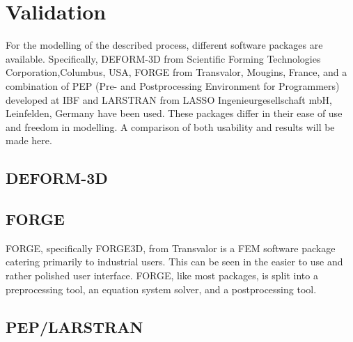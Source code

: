 \section{Validation}

For the modelling of the described process, different software packages are available. Specifically, DEFORM-3D from Scientific Forming Technologies Corporation,Columbus, USA, FORGE from Transvalor, Mougins, France, and a combination of PEP (Pre- and Postprocessing Environment for Programmers) developed at IBF and LARSTRAN from LASSO Ingenieurgesellschaft mbH, Leinfelden, Germany have been used. These packages differ in their ease of use and freedom in modelling. A comparison of both usability and results will be made here.

\subsection{DEFORM-3D}

\subsection{FORGE}
FORGE, specifically FORGE3D, from Transvalor is a FEM software package catering primarily to industrial users. This can be seen in the easier to use and rather polished user interface. FORGE, like most packages, is split into a preprocessing tool, an equation system solver, and a postprocessing tool. 

\subsection{PEP/LARSTRAN}
